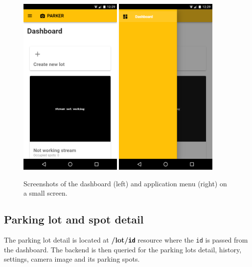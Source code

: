 \documentclass[thesis=M,english]{FITthesis}[2019/03/06]
\begin{document}
\begin{figure}[ht]
	\centering
	\includegraphics[width=0.45\textwidth]{imgs/ss-mobile-dashboard.png}
	\includegraphics[width=0.45\textwidth]{imgs/ss-mobile-menu.png}
	\caption{Screenshots of the dashboard (left) and application menu (right) on a small screen.}
	\label{label:ss_dashboard_small}
\end{figure}
\subsection{Parking lot and spot detail}
The parking lot detail is located at \textbf{/lot/\texttt{id}} resource where the \texttt{id} is passed from the dashboard. The backend is then queried for the parking lots detail, history, settings, camera image and its parking spots.\\
\end{document}
